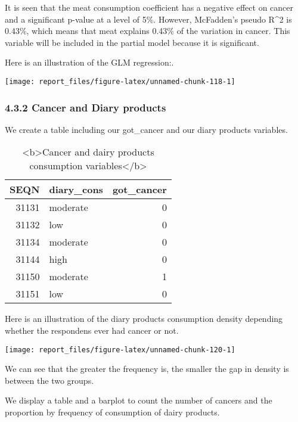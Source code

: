 \documentclass[
]{article}
\begin{document}
It is seen that the meat consumption coefficient has a negative effect
on cancer and a significant p-value at a level of 5\%. However,
McFadden's pseudo R\^{}2 is 0.43\%, which means that meat explains
0.43\% of the variation in cancer. This variable will be included in the
partial model because it is significant.

Here is an illustration of the GLM regression:.

\begin{center}\texttt{[image: report\_files/figure-latex/unnamed-chunk-118-1]} \end{center}

\hypertarget{cancer-and-diary-products}{%
\subsubsection{4.3.2 Cancer and Diary
products}\label{cancer-and-diary-products}}

We create a table including our got\_cancer and our diary products
variables.

\begin{table}

\caption{\label{tab:unnamed-chunk-119}<b>Cancer and dairy products consumption variables</b>}
\centering
\begin{tabular}[t]{r|l|r}
\hline
SEQN & diary\_cons & got\_cancer\\
\hline
31131 & moderate & 0\\
\hline
31132 & low & 0\\
\hline
31134 & moderate & 0\\
\hline
31144 & high & 0\\
\hline
31150 & moderate & 1\\
\hline
31151 & low & 0\\
\hline
\end{tabular}
\end{table}

Here is an illustration of the diary products consumption density
depending whether the respondens ever had cancer or not.

\begin{center}\texttt{[image: report\_files/figure-latex/unnamed-chunk-120-1]} \end{center}

We can see that the greater the frequency is, the smaller the gap in
density is between the two groups.

We display a table and a barplot to count the number of cancers and the
proportion by frequency of consumption of dairy products.
\end{document}
